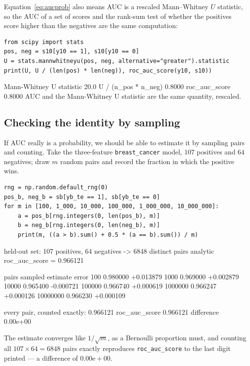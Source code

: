 \documentclass[11pt]{article}
\begin{document}
Equation~\eqref{eq:aucprob} also means AUC is a rescaled Mann--Whitney $U$
statistic, so the AUC of a set of scores and the rank-sum test of whether the
positives score higher than the negatives are the same computation:

\begin{lstlisting}
from scipy import stats
pos, neg = s10[y10 == 1], s10[y10 == 0]
U = stats.mannwhitneyu(pos, neg, alternative="greater").statistic
print(U, U / (len(pos) * len(neg)), roc_auc_score(y10, s10))
\end{lstlisting}
\begin{codeout}
Mann-Whitney U statistic  20.0
U / (n_pos * n_neg)       0.8000
roc_auc_score             0.8000
AUC and the Mann-Whitney U statistic are the same quantity, rescaled.
\end{codeout}

\subsection{Checking the identity by sampling}

If AUC really is a probability, we should be able to estimate it by sampling
pairs and counting. Take the three-feature \texttt{breast\_cancer} model,
$107$ positives and $64$ negatives; draw $m$ random pairs and record the fraction
in which the positive wins.

\begin{lstlisting}
rng = np.random.default_rng(0)
pos_b, neg_b = sb[yb_te == 1], sb[yb_te == 0]
for m in [100, 1_000, 10_000, 100_000, 1_000_000, 10_000_000]:
    a = pos_b[rng.integers(0, len(pos_b), m)]
    b = neg_b[rng.integers(0, len(neg_b), m)]
    print(m, ((a > b).sum() + 0.5 * (a == b).sum()) / m)
\end{lstlisting}
\begin{codeout}
held-out set: 107 positives, 64 negatives -> 6848 distinct pairs
analytic roc_auc_score = 0.966121

   pairs sampled   estimate     error
             100   0.980000  +0.013879
            1000   0.969000  +0.002879
           10000   0.965400  -0.000721
          100000   0.966740  +0.000619
         1000000   0.966247  +0.000126
        10000000   0.966230  +0.000109

every pair, counted exactly:
   0.966121   roc_auc_score 0.966121   difference 0.00e+00
\end{codeout}

The estimate converges like $1/\sqrt{m}$, as a Bernoulli proportion must, and
counting all $107 \times 64 = 6848$ pairs exactly reproduces
\texttt{roc\_auc\_score} to the last digit printed --- a difference of
$0.00\mathrm{e}{+}00$.
\end{document}
